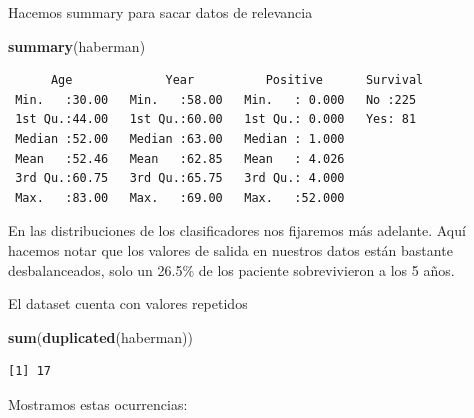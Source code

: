 \documentclass[
]{article}
\newenvironment{Shaded}{\begin{snugshade}}{\end{snugshade}}
\newcommand{\DataTypeTok}[1]{\textcolor[rgb]{0.13,0.29,0.53}{#1}}
\newcommand{\KeywordTok}[1]{\textcolor[rgb]{0.13,0.29,0.53}{\textbf{#1}}}
\newcommand{\NormalTok}[1]{#1}
\newcommand{\OperatorTok}[1]{\textcolor[rgb]{0.81,0.36,0.00}{\textbf{#1}}}
\newcommand{\OtherTok}[1]{\textcolor[rgb]{0.56,0.35,0.01}{#1}}
\newcommand{\StringTok}[1]{\textcolor[rgb]{0.31,0.60,0.02}{#1}}
\begin{document}
Hacemos summary para sacar datos de relevancia

\begin{Shaded}
\begin{Highlighting}[]
\KeywordTok{summary}\NormalTok{(haberman)}
\end{Highlighting}
\end{Shaded}

\begin{verbatim}
      Age             Year          Positive      Survival 
 Min.   :30.00   Min.   :58.00   Min.   : 0.000   No :225  
 1st Qu.:44.00   1st Qu.:60.00   1st Qu.: 0.000   Yes: 81  
 Median :52.00   Median :63.00   Median : 1.000            
 Mean   :52.46   Mean   :62.85   Mean   : 4.026            
 3rd Qu.:60.75   3rd Qu.:65.75   3rd Qu.: 4.000            
 Max.   :83.00   Max.   :69.00   Max.   :52.000            
\end{verbatim}

En las distribuciones de los clasificadores nos fijaremos más adelante.
Aquí hacemos notar que los valores de salida en nuestros datos están
bastante desbalanceados, solo un 26.5\% de los paciente sobrevivieron a
los 5 años.

El dataset cuenta con valores repetidos

\begin{Shaded}
\begin{Highlighting}[]
\KeywordTok{sum}\NormalTok{(}\KeywordTok{duplicated}\NormalTok{(haberman))}
\end{Highlighting}
\end{Shaded}

\begin{verbatim}
[1] 17
\end{verbatim}

Mostramos estas ocurrencias:

\begin{Shaded}
\end{Shaded}
\end{document}
